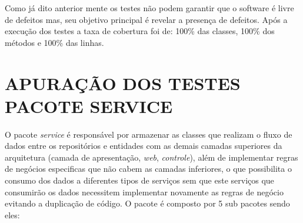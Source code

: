 Como já dito anterior mente os testes não podem garantir que o software é livre de defeitos mas, seu objetivo principal é revelar a presença de defeitos. Após a execução dos testes a taxa de cobertura foi de: 100\% das classes, 100\% dos métodos e 100\% das linhas.


\section{APURAÇÃO DOS TESTES PACOTE SERVICE}



O pacote \textit{service} é responsável por armazenar as classes que realizam o fluxo de dados entre  os repositórios e entidades com as demais camadas superiores da arquitetura (camada de apresentação, \textit{web}, \textit{controle}), além de implementar regras de negócios especificas que não cabem as camadas inferiores, o que possibilita o consumo dos dados a diferentes tipos de serviços sem que este serviços que consumirão os dados necessitem implementar novamente as regras de negócio evitando a duplicação de código. O pacote é composto por 5 sub pacotes sendo eles: 


